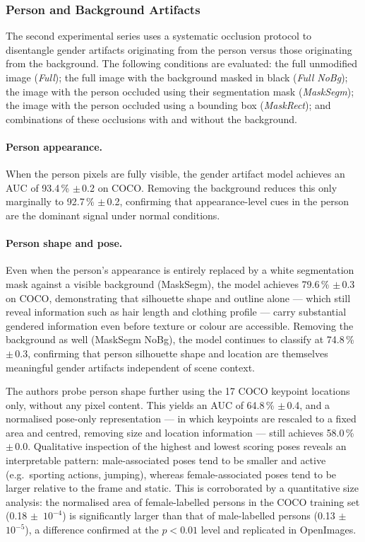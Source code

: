 \subsubsection*{Person and Background Artifacts}

The second experimental series uses a systematic occlusion protocol to disentangle gender
artifacts originating from the person versus those originating from the background.  The
following conditions are evaluated: the full unmodified image (\emph{Full}); the full image
with the background masked in black (\emph{Full NoBg}); the image with the person occluded
using their segmentation mask (\emph{MaskSegm}); the image with the person occluded using a
bounding box (\emph{MaskRect}); and combinations of these occlusions with and without the
background.

\paragraph{Person appearance.}
When the person pixels are fully visible, the gender artifact model achieves an AUC of
93.4\,\% $\pm$\,0.2 on COCO.  Removing the background reduces this only marginally to
92.7\,\% $\pm$\,0.2, confirming that appearance-level cues in the person are the dominant
signal under normal conditions.

\paragraph{Person shape and pose.}
Even when the person's appearance is entirely replaced by a white segmentation mask against
a visible background (MaskSegm), the model achieves 79.6\,\% $\pm$\,0.3 on COCO,
demonstrating that silhouette shape and outline alone --- which still reveal information such
as hair length and clothing profile --- carry substantial gendered information even before
texture or colour are accessible.  Removing the background as well (MaskSegm NoBg), the
model continues to classify at 74.8\,\% $\pm$\,0.3, confirming that person silhouette shape
and location are themselves meaningful gender artifacts independent of scene context.

The authors probe person shape further using the 17 COCO keypoint locations only, without
any pixel content.  This yields an AUC of 64.8\,\% $\pm$\,0.4, and a normalised pose-only
representation --- in which keypoints are rescaled to a fixed area and centred, removing
size and location information --- still achieves 58.0\,\% $\pm$\,0.0.  Qualitative
inspection of the highest and lowest scoring poses reveals an interpretable pattern:
male-associated poses tend to be smaller and active (e.g.\ sporting actions, jumping),
whereas female-associated poses tend to be larger relative to the frame and static.  This
is corroborated by a quantitative size analysis: the normalised area of female-labelled
persons in the COCO training set (0.18 $\pm$\, $10^{-4}$) is significantly larger than that
of male-labelled persons (0.13 $\pm$\, $10^{-5}$), a difference confirmed at the $p <
0.01$ level and replicated in OpenImages.


